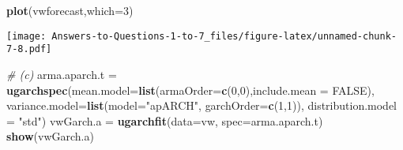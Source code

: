 \documentclass[
]{article}
\newenvironment{Shaded}{\begin{snugshade}}{\end{snugshade}}
\newcommand{\AttributeTok}[1]{\textcolor[rgb]{0.13,0.29,0.53}{#1}}
\newcommand{\CommentTok}[1]{\textcolor[rgb]{0.56,0.35,0.01}{\textit{#1}}}
\newcommand{\ConstantTok}[1]{\textcolor[rgb]{0.56,0.35,0.01}{#1}}
\newcommand{\DecValTok}[1]{\textcolor[rgb]{0.00,0.00,0.81}{#1}}
\newcommand{\FunctionTok}[1]{\textcolor[rgb]{0.13,0.29,0.53}{\textbf{#1}}}
\newcommand{\NormalTok}[1]{#1}
\newcommand{\OtherTok}[1]{\textcolor[rgb]{0.56,0.35,0.01}{#1}}
\newcommand{\StringTok}[1]{\textcolor[rgb]{0.31,0.60,0.02}{#1}}
\begin{document}
\begin{Shaded}
\begin{Highlighting}[]
\FunctionTok{plot}\NormalTok{(vwforecast,}\AttributeTok{which=}\DecValTok{3}\NormalTok{)}
\end{Highlighting}
\end{Shaded}

\texttt{[image: Answers-to-Questions-1-to-7\_files/figure-latex/unnamed-chunk-7-8.pdf]}

\begin{Shaded}
\begin{Highlighting}[]
\CommentTok{\# (c)}
\NormalTok{arma.aparch.t }\OtherTok{=} \FunctionTok{ugarchspec}\NormalTok{(}\AttributeTok{mean.model=}\FunctionTok{list}\NormalTok{(}\AttributeTok{armaOrder=}\FunctionTok{c}\NormalTok{(}\DecValTok{0}\NormalTok{,}\DecValTok{0}\NormalTok{),}\AttributeTok{include.mean =} \ConstantTok{FALSE}\NormalTok{),}
\AttributeTok{variance.model=}\FunctionTok{list}\NormalTok{(}\AttributeTok{model=}\StringTok{"apARCH"}\NormalTok{,}
\AttributeTok{garchOrder=}\FunctionTok{c}\NormalTok{(}\DecValTok{1}\NormalTok{,}\DecValTok{1}\NormalTok{)),}
\AttributeTok{distribution.model =} \StringTok{"std"}\NormalTok{)}
\NormalTok{vwGarch.a }\OtherTok{=} \FunctionTok{ugarchfit}\NormalTok{(}\AttributeTok{data=}\NormalTok{vw, }\AttributeTok{spec=}\NormalTok{arma.aparch.t)}
\FunctionTok{show}\NormalTok{(vwGarch.a)}
\end{Highlighting}
\end{Shaded}
\end{document}
